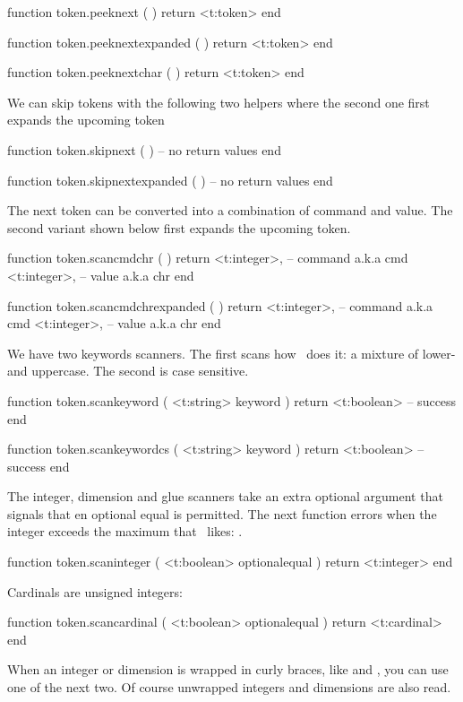 \starttyping[option=LUA]
function token.peeknext ( )
    return <t:token>
end

function token.peeknextexpanded ( )
    return <t:token>
end

function token.peeknextchar ( )
    return <t:token>
end
\stoptyping

We can skip tokens with the following two helpers where the second one first
expands the upcoming token

\starttyping[option=LUA]
function token.skipnext ( )
    -- no return values
end

function token.skipnextexpanded ( )
    -- no return values
end
\stoptyping

The next token can be converted into a combination of command and value. The
second variant shown below first expands the upcoming token.

\starttyping[option=LUA]
function token.scancmdchr ( )
    return
        <t:integer>, -- command a.k.a cmd
        <t:integer>, -- value   a.k.a chr
end

function token.scancmdchrexpanded ( )
    return
        <t:integer>, -- command a.k.a cmd
        <t:integer>, -- value   a.k.a chr
end
\stoptyping

We have two keywords scanners. The first scans how \TEX\ does it: a mixture of
lower- and uppercase. The second is case sensitive.

\starttyping[option=LUA]
function token.scankeyword ( <t:string> keyword )
    return <t:boolean> -- success
end

function token.scankeywordcs ( <t:string> keyword )
    return <t:boolean> -- success
end
\stoptyping

The integer, dimension and glue scanners take an extra optional argument that
signals that en optional equal is permitted. The next function errors when
the integer exceeds the maximum that \TEX\ likes: \number \maxcount .

\starttyping[option=LUA]
function token.scaninteger ( <t:boolean> optionalequal )
    return <t:integer>
end
\stoptyping

Cardinals are unsigned integers:

\starttyping[option=LUA]
function token.scancardinal ( <t:boolean> optionalequal )
    return <t:cardinal>
end
\stoptyping

When an integer or dimension is wrapped in curly braces, like  and
\type {{4.5pt}}, you can use one of the next two. Of course unwrapped integers
and dimensions are also read.

